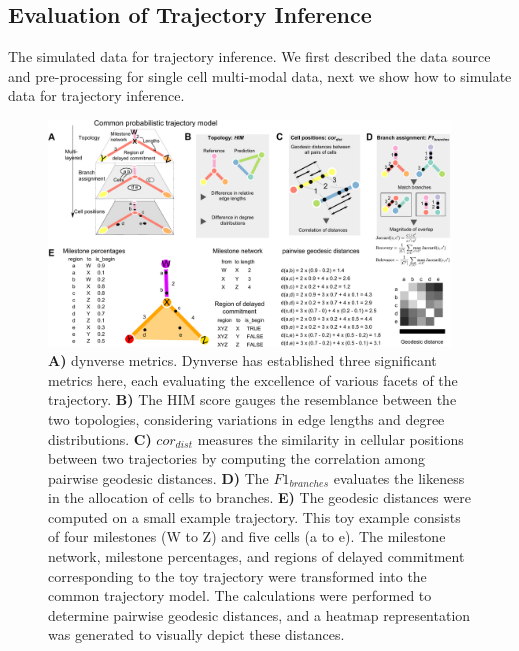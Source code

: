 \subsection{Evaluation of Trajectory Inference}
\label{PHLOWER_bench:metrics}
The simulated data for trajectory inference. We first described the data source and pre-processing for single cell multi-modal data, next we show how to simulate data for trajectory inference.
\begin{figure}[!h]
	\centering
	\includegraphics[width=0.95\textwidth]{dynverse_metrics/fig}
	\vspace{0.1cm}
	\caption[Dynverse metrics]{ \textbf{A)} dynverse metrics. Dynverse has established three significant metrics here, each evaluating the excellence of various facets of the trajectory. \textbf{B)} The HIM score gauges the resemblance between the two topologies, considering variations in edge lengths and degree distributions. \textbf{C)} $cor_{dist}$ measures the similarity in cellular positions between two trajectories by computing the correlation among pairwise geodesic distances. \textbf{D)} The $F1_{branches}$ evaluates the likeness in the allocation of cells to branches. \textbf{E)} The geodesic distances were computed on a small example trajectory. This toy example consists of four milestones (W to Z) and five cells (a to e). The milestone network, milestone percentages, and regions of delayed commitment corresponding to the toy trajectory were transformed into the common trajectory model. The calculations were performed to determine pairwise geodesic distances, and a heatmap representation was generated to visually depict these distances.}
	\label{fig:dynverse_metrics}
\end{figure}

